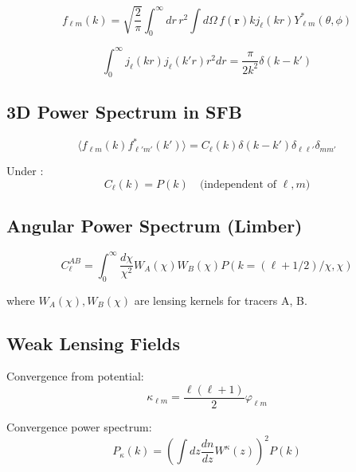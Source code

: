 \begin{equation}
f_{\ell m}(k) = \sqrt{\frac{2}{\pi}} \int_0^\infty dr \, r^2 \int d\Omega \, f(\mathbf{r}) k j_\ell(kr) Y^*_{\ell m}(\theta, \phi)
\label{eq:qr_sfb_inverse}
\end{equation}

\begin{equation}
\int_0^\infty j_\ell(kr) j_\ell(k'r) r^2 dr = \frac{\pi}{2k^2} \delta(k - k')
\label{eq:qr_bessel_ortho}
\end{equation}

\subsection{3D Power Spectrum in SFB}\label{subsec:qr_3dps}

\begin{equation}
\langle f_{\ell m}(k) f^*_{\ell' m'}(k') \rangle = C_\ell(k) \delta(k - k') \delta_{\ell\ell'} \delta_{mm'}
\label{eq:qr_sfb_power}
\end{equation}

Under \SIH:
\begin{equation}
C_\ell(k) = P(k) \quad \text{(independent of $\ell, m$)}
\label{eq:qr_isotropy}
\end{equation}

\subsection{Angular Power Spectrum (Limber)}\label{subsec:qr_limber}

\begin{equation}
C_\ell^{AB} = \int_0^\infty \frac{d\chi}{\chi^2} W_A(\chi) W_B(\chi) P(k = (\ell + 1/2)/\chi, \chi)
\label{eq:qr_limber_cl}
\end{equation}

where $W_A(\chi), W_B(\chi)$ are lensing kernels for tracers A, B.

\subsection{Weak Lensing Fields}\label{subsec:qr_lensing}

Convergence from potential:
\begin{equation}
\kappa_{\ell m} = \frac{\ell(\ell+1)}{2} \varphi_{\ell m}
\label{eq:qr_kappa_phi}
\end{equation}

Convergence power spectrum:
\begin{equation}
P_\kappa(k) = \left(\int dz \frac{dn}{dz} W^\kappa(z)\right)^2 P(k)
\label{eq:qr_pkappa}
\end{equation}

